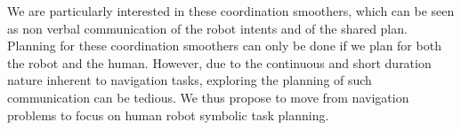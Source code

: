 \documentclass[a4paper,11pt,twoside]{StyleThese}
\begin{document}
We are particularly interested in these coordination smoothers, which can be seen as non verbal communication of the robot intents and of the shared plan. Planning for these coordination smoothers can only be done if we plan for both the robot and the human. However, due to the continuous and short duration nature inherent to navigation tasks, exploring the planning of such communication can be tedious. We thus propose to move from navigation problems to focus on human robot symbolic task planning.


\ifdefined{}
\else


\end{document}
